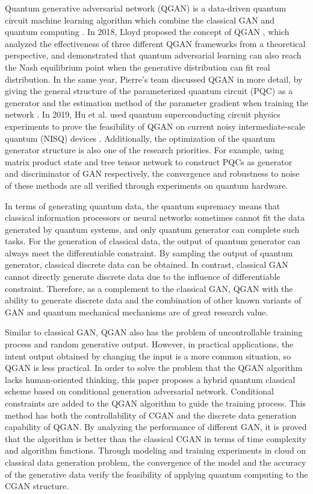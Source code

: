 \documentclass{bmcart}
\begin{document}
Quantum generative adversarial network (QGAN) is a data-driven quantum circuit machine learning algorithm which combine the classical GAN and quantum computing \cite{Marce}. In 2018, Lloyd proposed the concept of QGAN \cite{Seth}, which analyzed the effectiveness of three different QGAN frameworks from a theoretical perspective, and demonstrated that quantum adversarial learning can also reach the Nash equilibrium point when the generative distribution can fit real distribution. In the same year, Pierre's team discussed QGAN in more detail, by giving the general structure of the parameterized quantum circuit (PQC) as a generator and the estimation method of the parameter gradient when training the network \cite{Dalla}. In 2019, Hu et al. used quantum superconducting circuit physics experiments to prove the feasibility of QGAN on current noisy intermediate-scale quantum (NISQ) devices \cite{HuL}. Additionally, the optimization of the quantum generator structure is also one of the research priorities. For example, using matrix product state \cite{HanZ} and tree tensor network \cite{Hugg} to construct PQCs as generator and discriminator of GAN respectively, the convergence and robustness to noise of these methods are all verified through experiments on quantum hardware.


In terms of generating quantum data, the quantum supremacy means that classical information processors or neural networks sometimes cannot fit the data generated by quantum systems, and only quantum generator can complete such tasks. For the generation of classical data, the output of quantum generator can always meet the differentiable constraint. By sampling the output of quantum generator, classical discrete data can be obtained. In contrast, classical GAN cannot directly generate discrete data due to the influence of differentiable constraint. Therefore, as a complement to the classical GAN, QGAN with the ability to generate discrete data and the combination of other known variants of GAN and quantum mechanical mechanisms are of great research value.

Similar to classical GAN, QGAN also has the problem of uncontrollable training process and random generative output. However, in practical applications, the intent output obtained by changing the input is a more common situation, so QGAN is less practical. In order to solve the problem that the QGAN algorithm lacks human-oriented thinking, this paper proposes a hybrid quantum classical scheme based on conditional generation adversarial network. Conditional constraints are added to the QGAN algorithm to guide the training process. This method has both the controllability of CGAN and the discrete data generation capability of QGAN. By analyzing the performance of different GAN, it is proved that the algorithm is better than the classical CGAN in terms of time complexity and algorithm functions. Through modeling and training experiments in cloud on classical data generation problem, the convergence of the model and the accuracy of the generative data verify the feasibility of applying quantum computing to the CGAN structure.
\end{document}
